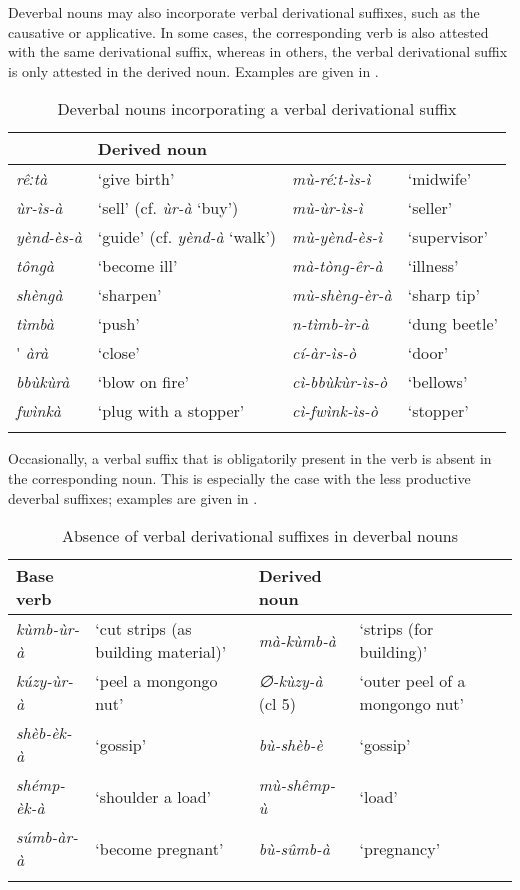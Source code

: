 Deverbal nouns may also incorporate verbal derivational suffixes, such as the causative or applicative. In some cases, the corresponding verb is also attested with the same derivational suffix, whereas in others, the verbal derivational suffix is only attested in the derived noun. Examples are given in .

\begin{table}
\label{bkm:Ref74564290}\caption{\label{tab:4:8}Deverbal nouns incorporating a verbal derivational suffix}
\begin{tabular}{llll}
\lsptoprule
\multicolumn{2}{l}{Base verb}  & \multicolumn{2}{l}{Derived noun}  \\
\midrule
\textit{rêːtà}  & ‘give birth’ & \textit{mù-réːt-ìs-ì} & ‘midwife’\\
\textit{ùr-ìs-à}  & ‘sell’ (cf. \textit{ùr-à} ‘buy’) & \textit{mù-ùr-ìs-ì} & ‘seller’\\
\textit{yènd-ès-à}  & ‘guide’ (cf. \textit{yènd-à} ‘walk’) & \textit{mù-yènd-ès-ì} & ‘supervisor’\\
\textit{tôngà} & ‘become ill’ & \textit{mà-tòng-êr-à} & ‘illness’\\
\textit{shèngà} & ‘sharpen’ & \textit{mù-shèng-èr-à} & ‘sharp tip’\\
\textit{tìmbà} & ‘push’ & \textit{n-tìmb-ìr-à} & ‘dung beetle’\\
\'{} \textit{àrà} & ‘close’ & \textit{cí-àr-ìs-ò} & ‘door’\\
\textit{bbùkùrà} & ‘blow on fire’ & \textit{cì-bbùkùr-ìs-ò} & ‘bellows’\\
\textit{fwìnkà} & ‘plug with a stopper’ & \textit{cì-fwìnk-ìs-ò} & ‘stopper’\\
\lspbottomrule
\end{tabular}
\end{table}

Occasionally, a verbal suffix that is obligatorily present in the verb is absent in the corresponding noun. This is especially the case with the less productive deverbal suffixes; examples are given in .

\begin{table}
\label{bkm:Ref74564302}\caption{\label{tab:4:9}Absence of verbal derivational suffixes in deverbal nouns}
\begin{tabularx}{\textwidth}{lQlQ}
\lsptoprule
Base verb &  & Derived noun & \\
\midrule
\textit{kùmb-ùr-à} & ‘cut strips (as building material)’ & \textit{mà-kùmb-à} & ‘strips (for building)’\\
\textit{kúzy-ùr-à} & ‘peel a mongongo nut’ & \textit{∅-kùzy-à} (cl 5) & ‘outer peel of a mongongo nut’\\
\textit{shèb-èk-à} & ‘gossip’ & \textit{bù-shèb-è} & ‘gossip’\\
\textit{shémp-èk-à} & ‘shoulder a load’ & \textit{mù-shêmp-ù} & ‘load’\\
\textit{súmb-àr-à} & ‘become pregnant’ & \textit{bù-sûmb-à} & ‘pregnancy’\\
\lspbottomrule
\end{tabularx}
\end{table}

